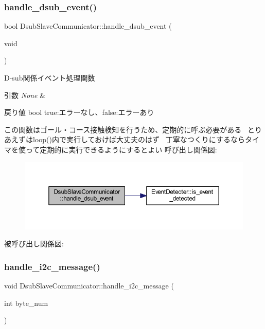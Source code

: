 \subsubsection{\texorpdfstring{handle\_dsub\_event()}{handle\_dsub\_event()}}
{\footnotesize\ttfamily bool Dsub\+Slave\+Communicator\+::handle\+\_\+dsub\+\_\+event (\begin{DoxyParamCaption}\item[{void}]{ }\end{DoxyParamCaption})}



D-\/sub関係イベント処理関数 


\begin{DoxyParams}{引数}
{\em None} & \\
\hline
\end{DoxyParams}
\begin{DoxyReturn}{戻り値}
bool true\+:エラーなし、false\+:エラーあり
\end{DoxyReturn}
この関数はゴール・コース接触検知を行うため、定期的に呼ぶ必要がある~\newline
とりあえずはloop()内で実行しておけば大丈夫のはず~\newline
丁寧なつくりにするならタイマを使って定期的に実行できるようにするとよい 呼び出し関係図\+:\nopagebreak
\begin{figure}[H]
\begin{center}
\leavevmode
\includegraphics[width=350pt]{class_dsub_slave_communicator_aef578741915e2e109b7b4d7813693cfe_cgraph}
\end{center}
\end{figure}
被呼び出し関係図\+:
\mbox{\label{class_dsub_slave_communicator_ad2b7d6a48942a55bea5f095da31eb683}} 
\subsubsection{\texorpdfstring{handle\_i2c\_message()}{handle\_i2c\_message()}}
{\footnotesize\ttfamily void Dsub\+Slave\+Communicator\+::handle\+\_\+i2c\+\_\+message (\begin{DoxyParamCaption}\item[{int}]{byte\+\_\+num }\end{DoxyParamCaption})\hspace{0.3cm}{\ttfamily [static]}}



